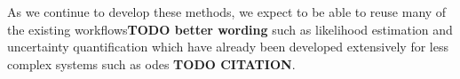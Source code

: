 \documentclass{article}
\begin{document}
As we continue to develop these methods, we expect to be able to reuse many of the existing
workflows\textbf{TODO better wording} such as likelihood estimation and uncertainty quantification
which have already been developed extensively for less complex systems such as \acp{ode}
\textbf{TODO CITATION}.

%
%
%
\end{document}
